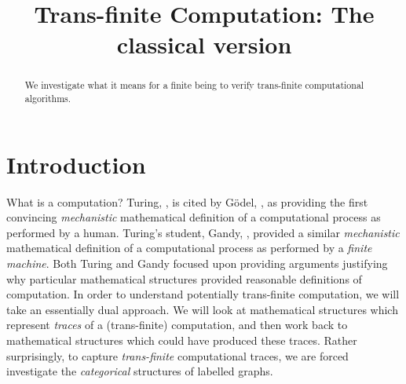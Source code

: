 \documentclass[a4paper]{amsart}
\begin{document}
\sloppy

\title[Computation: Classical version]{Trans-finite Computation: The classical version}

%

\begin{abstract}
We investigate what it means for a finite being to verify trans-finite computational
algorithms.
\end{abstract} 
\maketitle 
\tableofcontents 


\section{Introduction}

What is a computation? Turing, \cite{turing1936computableNumbersMachines}, is cited by
G\"odel, \cite{godel}, as providing the first convincing \emph{mechanistic} mathematical
definition of a computational process as performed by a human. Turing's student, Gandy,
\cite{gandy1980churchsThesisMechanisms}, provided a similar \emph{mechanistic}
mathematical definition of a computational process as performed by a \emph{finite
machine}. Both Turing and Gandy focused upon providing arguments justifying why particular
mathematical structures provided reasonable definitions of computation. In order to
understand potentially trans-finite computation, we will take an essentially dual
approach. We will look at mathematical structures which represent \emph{traces} of a
(trans-finite) computation, and then work back to mathematical structures which could have
produced these traces. Rather surprisingly, to capture \emph{trans-finite} computational
traces, we are forced investigate the \emph{categorical} structures of labelled graphs.
\end{document}
